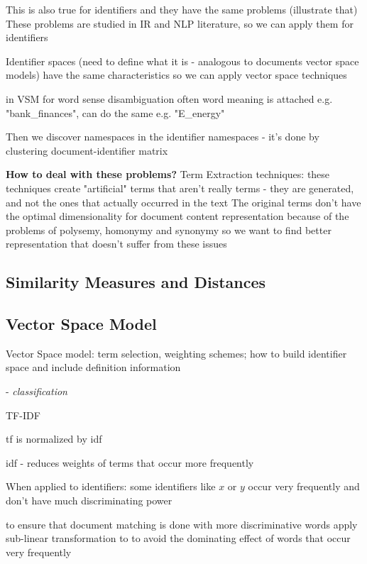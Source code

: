 This is also true for identifiers and they have the same problems (illustrate that)
These problems are studied in IR and NLP literature, so we can apply them for identifiers


Identifier spaces (need to define what it is - analogous to documents vector space models) have the same characteristics so we can apply vector space techniques

in VSM for word sense disambiguation often word meaning is attached e.g. "bank\_finances", can do the same e.g. "E\_energy"

Then we discover namespaces in the identifier namespaces - it's done by clustering document-identifier matrix


\textbf{How to deal with these problems?} Term Extraction techniques:
these techniques create "artificial" terms that aren't really terms - they are generated, and not the ones that actually occurred in the text
The original terms don't have the optimal dimensionality for document content representation
because of the problems of polysemy, homonymy and synonymy
so we want to find better representation that doesn't suffer from these issues


\subsection{Similarity Measures and Distances}



\subsection{Vector Space Model}

Vector Space model: term selection, weighting schemes; how to build identifier space and include definition information

\cite{sebastiani2002machine} - \emph{classification}



TF-IDF


tf is normalized by idf

idf - reduces weights of terms that occur more frequently

When applied to identifiers: some identifiers like $x$ or $y$ occur very frequently and don't have much discriminating power


to ensure that document matching is done with more discriminative words
apply sub-linear transformation to to avoid the dominating effect of words that occur very frequently


